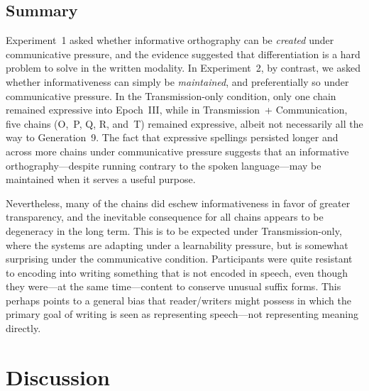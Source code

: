 \documentclass[doc,biblatex]{apa7}
\begin{document}
\subsection{Summary}

Experiment~1 asked whether informative orthography can be \textit{created} under communicative pressure, and the evidence suggested that differentiation is a hard problem to solve in the written modality. In Experiment~2, by contrast, we asked whether informativeness can simply be \textit{maintained}, and preferentially so under communicative pressure. In the Transmission-only condition, only one chain remained expressive into Epoch~III, while in Transmission~+ Communication, five chains (O,~P, Q, R, and~T) remained expressive, albeit not necessarily all the way to Generation~9. The fact that expressive spellings persisted longer and across more chains under communicative pressure suggests that an informative orthography---despite running contrary to the spoken language---may be maintained when it serves a useful purpose.

Nevertheless, many of the chains did eschew informativeness in favor of greater transparency, and the inevitable consequence for all chains appears to be degeneracy in the long term. This is to be expected under Transmission-only, where the systems are adapting under a learnability pressure, but is somewhat surprising under the communicative condition. Participants were quite resistant to encoding into writing something that is not encoded in speech, even though they were---at the same time---content to conserve unusual suffix forms. This perhaps points to a general bias that reader/writers might possess in which the primary goal of writing is seen as representing speech---not representing meaning directly.


\section{Discussion}
\end{document}
